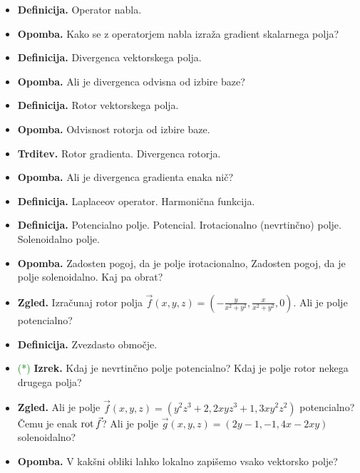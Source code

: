 \begin{enumerate}
\begin{itemize}
        \item \textbf{Definicija.} Operator nabla.
        \item \textbf{Opomba.} Kako se z operatorjem nabla izraža gradient skalarnega polja? 
        \item \textbf{Definicija.} Divergenca vektorskega polja.
        \item \textbf{Opomba.} Ali je divergenca odvisna od izbire baze?
        \item \textbf{Definicija.} Rotor vektorskega polja.
        \item \textbf{Opomba.} Odvisnost rotorja od izbire baze.
        \item \textbf{Trditev.} Rotor gradienta. Divergenca rotorja.
        \item \textbf{Opomba.} Ali je divergenca gradienta enaka nič?
        \item \textbf{Definicija.} Laplaceov operator. Harmonična funkcija.
        \item \textbf{Definicija.} Potencialno polje. Potencial. Irotacionalno (nevrtinčno) polje. Solenoidalno polje.
        \item \textbf{Opomba.} Zadosten pogoj, da je polje irotacionalno, Zadosten pogoj, da je polje solenoidalno. Kaj pa obrat?
        \item \textbf{Zgled.} Izračunaj rotor polja \(\vec{f}(x,y,z) = \left(-\frac{y}{x^2 + y^2}, \frac{x}{x^2+y^2}, 0\right)\). Ali je polje potencialno?
        \item \textbf{Definicija.} Zvezdasto območje.
        \item \textcolor{green}{(*)} \textbf{Izrek.} Kdaj je nevrtinčno polje potencialno? Kdaj je polje rotor nekega drugega polja?
        \item \textbf{Zgled.} Ali je polje \(\vec{f}(x,y,z) = (y^2z^3 + 2, 2xyz^3 + 1, 3xy^2z^2)\) potencialno? Čemu je enak \(\operatorname{rot} \vec{f}\)? Ali je polje \(\vec{g}(x,y,z) = (2y-1, -1, 4x - 2xy)\) solenoidalno?
        \item \textbf{Opomba.} V kakšni obliki lahko lokalno zapišemo vsako vektorsko polje?
    \end{itemize}
\end{enumerate}

